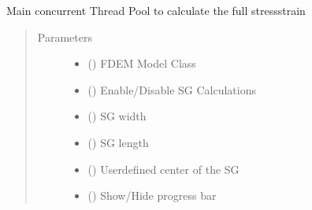 \documentclass[letterpaper,10pt,english]{sphinxmanual}
\begin{document}
\begin{fulllineitems}
\label{\detokenize{openfdem:openfdem.complete_BD_thread_pool_generators.main}}
Main concurrent Thread Pool to calculate the full stress\sphinxhyphen{}strain
\begin{quote}\begin{description}
\item[{Parameters}] \leavevmode\begin{itemize}
\item {} 
 ({\hyperref[\detokenize{openfdem:openfdem.openfdem.Model}]{}}) \textendash{} FDEM Model Class

\item {} 
 () \textendash{} Enable/Disable SG Calculations

\item {} 
 () \textendash{} SG width

\item {} 
 () \textendash{} SG length

\item {} 
 (\sphinxstyleliteralemphasis{\sphinxupquote{{[}}}\sphinxstyleliteralemphasis{\sphinxupquote{, }}\sphinxstyleliteralemphasis{\sphinxupquote{, }}\sphinxstyleliteralemphasis{\sphinxupquote{{]}}}) \textendash{} User\sphinxhyphen{}defined center of the SG

\item {} 
 () \textendash{} Show/Hide progress bar


\end{itemize}
\end{description}
\end{quote}
\end{fulllineitems}
\end{document}
